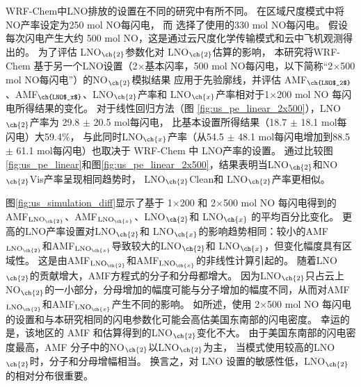 WRF-Chem中LNO排放的设置在不同的研究中有所不同。
\citet{Zhao.2009}在区域尺度模式中将NO产率设定为250 mol NO每闪电，
而 \citet{Bela.2016}选择了\citet{Barth.2012}使用的330 mol NO每闪电。
\citet{Wang.2015a}假设每次闪电产生大约 500 mol NO，这是通过云尺度化学传输模式和云中飞机观测得出的\citep{Ott.2010}。
为了评估 LNO$_{\ch{2}}$参数化对 LNO$_{\ch{2}}$估算的影响，
本研究将WRF-Chem 基于另一个LNO设置（2$\times$基本闪率，500 mol NO每闪电，以下简称“2$\times$500 mol NO每闪电”）的NO$_{\ch{2}}$模拟结果
应用于先验廓线，并评估 AMF$_{\ch{LNO$_2$}}$、AMF$_{\ch{LNO$_x$}}$、LNO$_{\ch{2}}$产率和 LNO$_{\ch{x}}$产率相对于1$\times$200 mol NO 每闪电所得结果的变化。
对于线性回归方法（图 \ref{fig:us_pe_linear_2x500}），LNO$_{\ch{2}}$产率为 29.8 $\pm$ 20.5 mol每闪电，
比基本设置所得结果（18.7 $\pm$ 18.1 mol每闪电）大59.4\%，
与此同时LNO$_{\ch{x}}$产率（从54.5 $\pm$ 48.1 mol每闪电增加到88.5 $\pm$ 61.1 mol每闪电）也取决于 WRF-Chem 中 LNO产率的设置。
通过比较图\ref{fig:us_pe_linear}和图\ref{fig:us_pe_linear_2x500}，结果表明当LNO$_{\ch{2}}$和NO$_{\ch{2}}$Vis产率呈现相同趋势时，
LNO$_{\ch{2}}$Clean和 LNO$_{\ch{2}}$产率更相似。


图\ref{fig:us_simulation_diff}显示了基于 1$\times$200 和 2$\times$500 mol NO 每闪电得到的AMF$_\textrm{LNO$_{\ch{2}}$}$、AMF$_\textrm{LNO$_{\ch{x}}$}$、LNO$_{\ch{2}}$和 LNO$_{\ch{x}}$ 的平均百分比变化。
更高的LNO产率设置对LNO$_{\ch{2}}$和 LNO$_{\ch{x}}$的影响趋势相同：较小的AMF$_\textrm{LNO$_{\ch{2}}$}$和AMF$_\textrm{LNO$_{\ch{x}}$}$导致较大的LNO$_{\ch{2}}$和 LNO$_{\ch{x}}$，但变化幅度具有区域性。
这是由AMF$_\textrm{LNO$_{\ch{2}}$}$和AMF$_\textrm{LNO$_{\ch{x}}$}$的非线性计算引起的。
随着LNO$_{\ch{2}}$的贡献增大，AMF方程式的分子和分母都增大。
因为LNO$_{\ch{2}}$只占云上NO$_{\ch{2}}$的一小部分，分母增加的幅度可能与分子增加的幅度不同，从而对AMF$_\textrm{LNO$_{\ch{2}}$}$和AMF$_\textrm{LNO$_{\ch{x}}$}$产生不同的影响。
如\citet{Zhu.2019}所述，使用 2$\times$500 mol NO 每闪电的设置和与本研究相同的闪电参数化可能会高估美国东南部的闪电密度。
幸运的是，该地区的 AMF 和估算得到的LNO$_{\ch{2}}$变化不大。
由于美国东南部的闪电密度最高，AMF 分子中的NO$_{\ch{2}}$以LNO$_{\ch{2}}$为主，
当模式使用较高的LNO$_{\ch{2}}$时，分子和分母增幅相当。
换言之，对 LNO 设置的敏感性低，LNO$_{\ch{2}}$的相对分布很重要。


